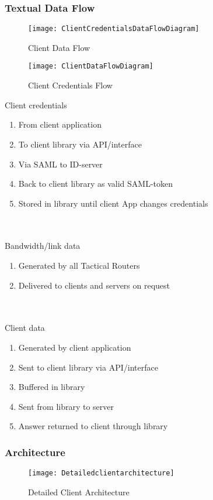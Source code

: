 		
	\subsubsection{Textual Data Flow}\label{textual client data flow}
        
    \begin{figure}[h]
        \centering
        \texttt{[image: ClientCredentialsDataFlowDiagram]}
        \caption{Client Data Flow}
        \label{fig:ClientCredentialsDataFlowDiagram}
    \end{figure}
    
    \begin{figure}[h]
        \centering
        \texttt{[image: ClientDataFlowDiagram]}
        \caption{Client Credentials Flow}
        \label{fig:ClientDataFlowDiagram}
    \end{figure}
    
		Client credentials
		\begin{enumerate}
			\item From client application
			\item To client library via API/interface
			\item Via SAML to ID-server
			\item Back to client library as valid SAML-token
			\item Stored in library until client App changes credentials
		\end{enumerate}
		\\\\
		Bandwidth/link data
		\begin{enumerate}
			\item Generated by all Tactical Routers
			\item Delivered to clients and servers on request
		\end{enumerate}
		\\\\
		Client data
		\begin{enumerate}
			\item Generated by client application
			\item Sent to client library via API/interface
			\item Buffered in library
			\item Sent from library to server
			\item Answer returned to client through library
		\end{enumerate}
		
	\subsubsection{Architecture}\label{client architecture}
		\begin{figure}[h]
			\centering	
			\texttt{[image: Detailedclientarchitecture]}
			\caption{Detailed Client Architecture}
			\label{fig:DetailedClientArchitecture}
		\end{figure}

